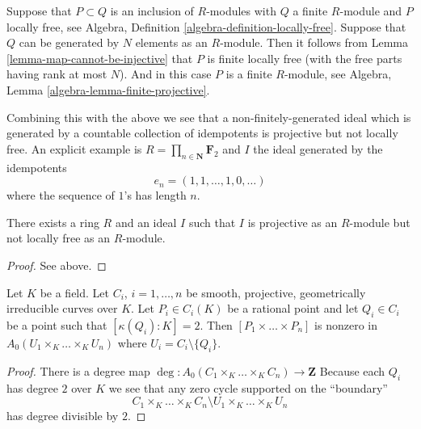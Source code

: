 \noindent
Suppose that $P \subset Q$ is an inclusion of $R$-modules with $Q$ a
finite $R$-module and $P$ locally free, see
Algebra, Definition \ref{algebra-definition-locally-free}.
Suppose that $Q$ can be generated by $N$ elements as an $R$-module.
Then it follows from
Lemma \ref{lemma-map-cannot-be-injective}
that $P$ is finite locally free (with the free parts having rank
at most $N$). And in this case $P$ is a finite $R$-module, see
Algebra, Lemma \ref{algebra-lemma-finite-projective}.

\medskip\noindent
Combining this with the above we see that a non-finitely-generated
ideal which is generated by a countable collection of idempotents
is projective but not locally free. An explicit example is
$R = \prod_{n \in \mathbf{N}} \mathbf{F}_2$ and
$I$ the ideal generated by the idempotents
$$
e_n = (1, 1, \ldots, 1, 0, \ldots )
$$
where the sequence of $1$'s has length $n$.

\begin{lemma}
\label{lemma-ideal-projective-not-locally-free}
There exists a ring $R$ and an ideal $I$ such that $I$ is projective as
an $R$-module but not locally free as an $R$-module.
\end{lemma}

\begin{proof}
See above.
\end{proof}

\begin{lemma}
\label{lemma-chow-group-product}
Let $K$ be a field.
Let $C_i$, $i = 1, \ldots, n$ be smooth, projective, geometrically irreducible
curves over $K$. Let $P_i \in C_i(K)$ be a rational point and
let $Q_i \in C_i$ be a point such that $[\kappa(Q_i) : K] = 2$.
Then $[P_1 \times \ldots \times P_n]$ is nonzero in
$A_0(U_1 \times_K \ldots \times_K U_n)$ where $U_i = C_i \setminus \{Q_i\}$.
\end{lemma}

\begin{proof}
There is a degree map
$\deg : A_0(C_1 \times_K \ldots \times_K C_n) \to \mathbf{Z}$
Because each $Q_i$ has degree $2$ over $K$ we see that
any zero cycle supported on the ``boundary''
$$
C_1 \times_K \ldots \times_K C_n
\setminus
U_1 \times_K \ldots \times_K U_n
$$
has degree divisible by $2$.
\end{proof}

